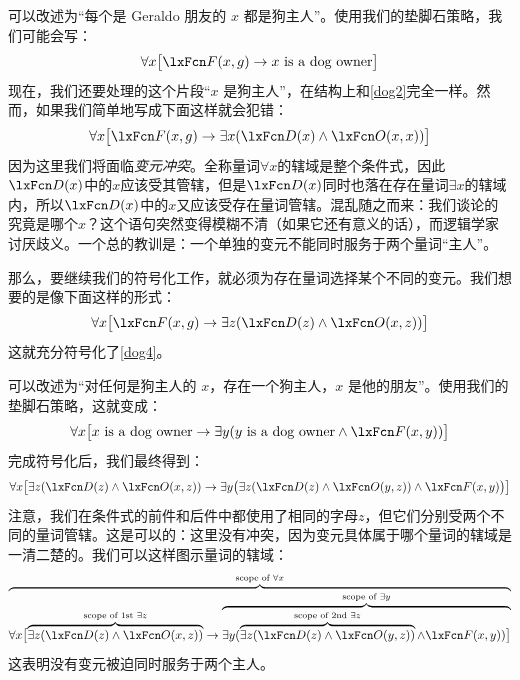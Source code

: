 可以改述为“每个是 Geraldo 朋友的 $x$ 都是狗主人”。使用我们的垫脚石策略，我们可能会写：
$$\forall x \bigl[\atom{F}{x,g} \eif x \text{ is a dog owner}\bigr]$$
现在，我们还要处理的这个片段“$x$ 是狗主人”，在结构上和\cref*{dog2}完全一样。然而，如果我们简单地写成下面这样就会犯错：
$$\forall x \bigl[\atom{F}{x,g} \eif \exists x(\atom{D}{x} \eand \atom{O}{x,x})\bigr]$$
因为这里我们将面临\emph{变元冲突}。全称量词$\forall x$的辖域是整个条件式，因此$\atom{D}{x}$中的$x$应该受其管辖，但是$\atom{D}{x}$同时也落在存在量词$\exists x$的辖域内，所以$\atom{D}{x}$中的$x$又应该受存在量词管辖。混乱随之而来：我们谈论的究竟是哪个$x$？这个语句突然变得模糊不清（如果它还有意义的话），而逻辑学家讨厌歧义。一个总的教训是：一个单独的变元不能同时服务于两个量词“主人”。

那么，要继续我们的符号化工作，就必须为存在量词选择某个不同的变元。我们想要的是像下面这样的形式：
$$\forall x\bigl[\atom{F}{x,g} \eif\exists z(\atom{D}{z} \eand \atom{O}{x,z})\bigr]$$
这就充分符号化了\cref*{dog4}。

可以改述为“对任何是狗主人的 $x$，存在一个狗主人，$x$ 是他的朋友”。使用我们的垫脚石策略，这就变成：
$$\forall x\bigl[\mbox{$x$ is a dog owner}\eif\exists y(\mbox{$y$ is a dog owner}\eand \atom{F}{x,y})\bigr]$$
完成符号化后，我们最终得到：
$$\forall x\bigl[\exists z(\atom{D}{z} \eand \atom{O}{x,z})\eif\exists y\bigl(\exists z(\atom{D}{z} \eand \atom{O}{y,z})\eand \atom{F}{x,y}\bigr)\bigr]$$
注意，我们在条件式的前件和后件中都使用了相同的字母$z$，但它们分别受两个不同的量词管辖。这是可以的：这里没有冲突，因为变元具体属于哪个量词的辖域是一清二楚的。我们可以这样图示量词的辖域：
$$\overbrace{\forall x\bigl[\overbrace{\exists z(\atom{D}{z} \eand \atom{O}{x,z})}^{\text{scope of 1st }\exists z}\eif \overbrace{\exists y(\overbrace{\exists z(\atom{D}{z} \eand \atom{O}{y,z})}^{\text{scope of 2nd }\exists z}\eand \atom{F}{x,y})\bigr]}^{\text{scope of }\exists y}}^{\text{scope of }\forall x}$$
这表明没有变元被迫同时服务于两个主人。

